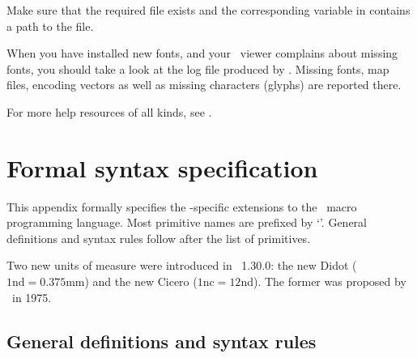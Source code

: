 \documentclass{pdftexmanual}
\begin{document}
{\begin{itemize}
       Make sure that the required file exists and the corresponding variable
       in  contains a path to the file.

       When you have installed new fonts, and your \PDF\ viewer complains
       about missing fonts, you should take a look at the log file produced
       by \PDFTEX. Missing fonts, map files, encoding vectors as well as
       missing characters (glyphs) are reported there.
\end{itemize}

For more help resources of all kinds, see .

\chapter{Formal syntax specification}
\label{sec.syntax}

This appendix formally specifies the \PDFTEX-specific extensions to the
\TEX\ macro programming language. Most primitive names are prefixed by
`'. General definitions and syntax rules follow after the list
of primitives.

Two new units of measure were introduced in \PDFTEX\ 1.30.0: the new
Didot ($\mbox{1nd}=0.375$mm) and the new Cicero ($\mbox{1nc}=12$nd). The
former was proposed by \ISO\ in 1975.

\begingroup
  \parindent=0pt
  \def\aftersyntax{\par\vskip 1.5pt plus1pt minus1pt\relax}



\section{General definitions and syntax rules}





}
\end{document}
